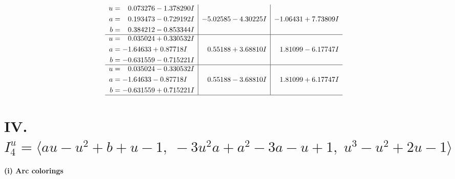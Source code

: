 \documentclass[1p]{elsarticle_modified}
\theoremstyle{definition}
\begin{document}
$$\begin{array}{c|c|c}
\begin{aligned}
u &= \phantom{-}0.073276 - 1.378290 I \\
a &= \phantom{-}0.193473 - 0.729192 I \\
b &= \phantom{-}0.384212 - 0.853344 I\end{aligned}
 & -5.02585 - 4.30225 I & -1.06431 + 7.73809 I \\ \hline\begin{aligned}
u &= \phantom{-}0.035024 + 0.330532 I \\
a &= -1.64633 + 0.87718 I \\
b &= -0.631559 - 0.715221 I\end{aligned}
 & \phantom{-}0.55188 + 3.68810 I & \phantom{-}1.81099 - 6.17747 I \\ \hline\begin{aligned}
u &= \phantom{-}0.035024 - 0.330532 I \\
a &= -1.64633 - 0.87718 I \\
b &= -0.631559 + 0.715221 I\end{aligned}
 & \phantom{-}0.55188 - 3.68810 I & \phantom{-}1.81099 + 6.17747 I\\
 \hline 
 \end{array}$$\newpage\newpage\renewcommand{\arraystretch}{1}
\centering \section*{IV. $I^u_{4}= \langle a u- u^2+b+u-1,\;-3 u^2 a+a^2-3 a- u+1,\;u^3- u^2+2 u-1 \rangle$}
\flushleft \textbf{(i) Arc colorings}\\
\end{document}
